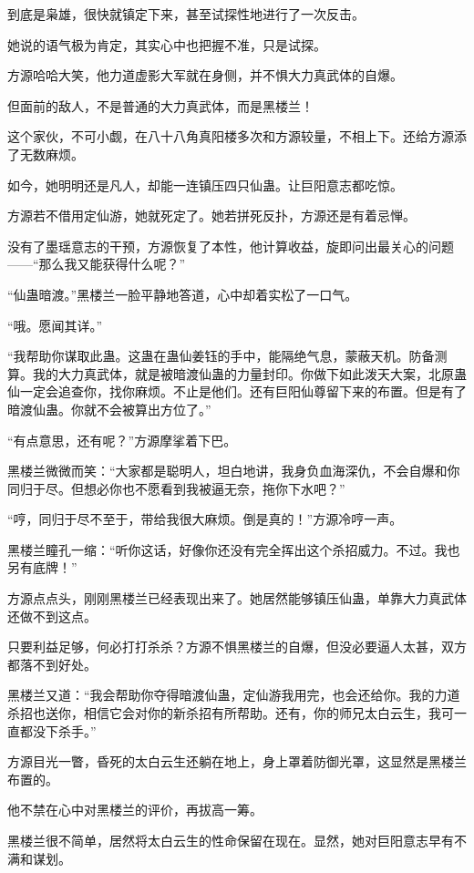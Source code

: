 \begin{this_body}
到底是枭雄，很快就镇定下来，甚至试探性地进行了一次反击。

她说的语气极为肯定，其实心中也把握不准，只是试探。

方源哈哈大笑，他力道虚影大军就在身侧，并不惧大力真武体的自爆。

但面前的敌人，不是普通的大力真武体，而是黑楼兰！

这个家伙，不可小觑，在八十八角真阳楼多次和方源较量，不相上下。还给方源添了无数麻烦。

如今，她明明还是凡人，却能一连镇压四只仙蛊。让巨阳意志都吃惊。

方源若不借用定仙游，她就死定了。她若拼死反扑，方源还是有着忌惮。

没有了墨瑶意志的干预，方源恢复了本性，他计算收益，旋即问出最关心的问题——“那么我又能获得什么呢？”

“仙蛊暗渡。”黑楼兰一脸平静地答道，心中却着实松了一口气。

“哦。愿闻其详。”

“我帮助你谋取此蛊。这蛊在蛊仙姜钰的手中，能隔绝气息，蒙蔽天机。防备测算。我的大力真武体，就是被暗渡仙蛊的力量封印。你做下如此泼天大案，北原蛊仙一定会追查你，找你麻烦。不止是他们。还有巨阳仙尊留下来的布置。但是有了暗渡仙蛊。你就不会被算出方位了。”

“有点意思，还有呢？”方源摩挲着下巴。

黑楼兰微微而笑：“大家都是聪明人，坦白地讲，我身负血海深仇，不会自爆和你同归于尽。但想必你也不愿看到我被逼无奈，拖你下水吧？”

“哼，同归于尽不至于，带给我很大麻烦。倒是真的！”方源冷哼一声。

黑楼兰瞳孔一缩：“听你这话，好像你还没有完全挥出这个杀招威力。不过。我也另有底牌！”

方源点点头，刚刚黑楼兰已经表现出来了。她居然能够镇压仙蛊，单靠大力真武体还做不到这点。

只要利益足够，何必打打杀杀？方源不惧黑楼兰的自爆，但没必要逼人太甚，双方都落不到好处。

黑楼兰又道：“我会帮助你夺得暗渡仙蛊，定仙游我用完，也会还给你。我的力道杀招也送你，相信它会对你的新杀招有所帮助。还有，你的师兄太白云生，我可一直都没下杀手。”

方源目光一瞥，昏死的太白云生还躺在地上，身上罩着防御光罩，这显然是黑楼兰布置的。

他不禁在心中对黑楼兰的评价，再拔高一筹。

黑楼兰很不简单，居然将太白云生的性命保留在现在。显然，她对巨阳意志早有不满和谋划。


\end{this_body}
